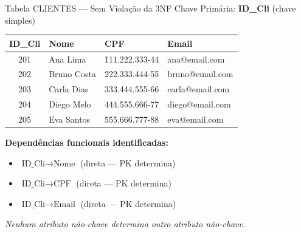 \documentclass[9pt]{beamer}
\begin{document}
\begin{frame}{Tabela CLIENTES — Sem Violação da 3NF}
\small
Chave Primária: \textbf{ID\_Cli} \quad (chave simples)

\vspace{0.2cm}
\centering
\begin{tabular}{|c|l|l|l|}
  \hline
  \textbf{ID\_Cli} & \textbf{Nome} & \textbf{CPF} & \textbf{Email} \\ \hline
  201 & Ana Lima    & 111.222.333-44 & ana@email.com \\ \hline
  202 & Bruno Costa & 222.333.444-55 & bruno@email.com \\ \hline
  203 & Carla Dias  & 333.444.555-66 & carla@email.com \\ \hline
  204 & Diego Melo  & 444.555.666-77 & diego@email.com \\ \hline
  205 & Eva Santos  & 555.666.777-88 & eva@email.com \\ \hline
\end{tabular}

\vspace{0.4cm}
\flushleft
\textbf{Dependências funcionais identificadas:}
\begin{itemize}
  \item $\text{ID\_Cli} \to \text{Nome}$ \quad \textcolor{green!60!black}{(direta — PK determina)}
  \item $\text{ID\_Cli} \to \text{CPF}$ \quad \textcolor{green!60!black}{(direta — PK determina)}
  \item $\text{ID\_Cli} \to \text{Email}$ \quad \textcolor{green!60!black}{(direta — PK determina)}
\end{itemize}
\textit{Nenhum atributo não-chave determina outro atributo não-chave.}
\end{frame}
\end{document}
